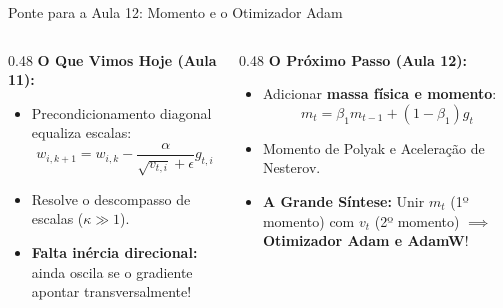 \documentclass[aspectratio=169, 10pt]{beamer}
\begin{document}
\begin{frame}{Ponte para a Aula 12: Momento e o Otimizador Adam}
  \begin{columns}[T]
    \begin{column}{0.48\textwidth}
      \textbf{O Que Vimos Hoje (Aula 11):}
      \begin{itemize}
        \item Precondicionamento diagonal equaliza escalas:
        \[w_{i, k+1} = w_{i, k} - \frac{\alpha}{\sqrt{v_{t, i}} + \epsilon} g_{t, i}\]
        \item Resolve o descompasso de escalas ($\kappa \gg 1$).
        \item \textbf{Falta inércia direcional:} ainda oscila se o gradiente apontar transversalmente!
      \end{itemize}
    \end{column}
    \begin{column}{0.48\textwidth}
      \textbf{O Próximo Passo (Aula 12):}
      \begin{itemize}
        \item Adicionar \textbf{massa física e momento}:
        \[m_t = \beta_1 m_{t-1} + (1 - \beta_1) g_t\]
        \item Momento de Polyak e Aceleração de Nesterov.
        \item \textbf{A Grande Síntese:} Unir $m_t$ (1º momento) com $v_t$ (2º momento) $\implies$ \textbf{Otimizador Adam e AdamW}!
      \end{itemize}
    \end{column}
  \end{columns}
\end{frame}
\end{document}
